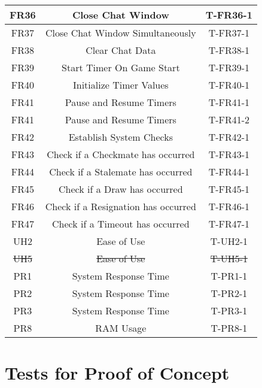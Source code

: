 \documentclass[12pt, titlepage]{article}
\begin{document}
\begin{center}
\begin{longtable}{ |c|c|c| }
        \hline
        FR36    & Close Chat Window                   & T-FR36-1 \\ 
        \hline
        FR37    & Close Chat Window Simultaneously            & T-FR37-1 \\ 
        \hline
        FR38    & Clear Chat Data              & T-FR38-1 \\ 
        \hline
        FR39    & Start Timer On Game Start               & T-FR39-1 \\ 
        \hline
        FR40    & Initialize Timer Values              & T-FR40-1 \\ 
        \hline
        FR41    & Pause and Resume Timers    & T-FR41-1 \\
        \hline
        FR41    & Pause and Resume Timers    & T-FR41-2 \\
        \hline
        FR42    & Establish System Checks     & T-FR42-1 \\
        \hline
        FR43    & Check if a Checkmate has occurred          & T-FR43-1 \\ 
        \hline
        FR44    & Check if a Stalemate has occurred   & T-FR44-1 \\
        \hline
        FR45    & Check if a Draw has occurred      & T-FR45-1 \\
        \hline
        FR46    & Check if a Resignation has occurred      & T-FR46-1 \\
        \hline
        FR47    & Check if a Timeout has occurred   & T-FR47-1 \\
        \hline
        UH2     & Ease of Use                           & T-UH2-1 \\ 
        \hline
        \sout{UH5}     & \sout{Ease of Use}                           & \sout{T-UH5-1} \\ 
        \hline
        PR1     & System Response Time                  & T-PR1-1 \\ 
        \hline
        PR2     & System Response Time                  & T-PR2-1 \\ 
        \hline
        PR3     & System Response Time                  & T-PR3-1 \\ 
        \hline
        PR8     & RAM Usage                             & T-PR8-1 \\ 
        \hline
    \end{longtable}
\end{center}
\section{Tests for Proof of Concept}
\end{document}
